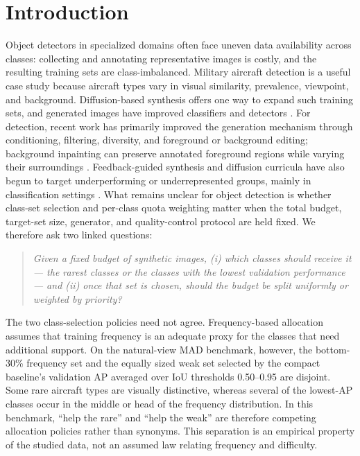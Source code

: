 \documentclass[preprint,12pt,authoryear]{elsarticle}
\begin{document}
\section{Introduction}\label{sec:intro}

Object detectors in specialized domains often face uneven data
availability across classes: collecting and annotating representative
images is costly, and the resulting training sets are class-imbalanced.
Military aircraft detection is a useful case study because aircraft
types vary in visual similarity, prevalence, viewpoint, and background.
Diffusion-based synthesis offers one way to expand such training sets,
and generated images have improved classifiers
\citep{azizi2023synthetic, he2023synthetic} and detectors
\citep{suri2024gen2det, feng2024instagen}. For detection, recent work has
primarily improved the generation mechanism through conditioning,
filtering, diversity, and foreground or background editing; background
inpainting can preserve annotated foreground regions while varying their
surroundings \citep{li2024background}. Feedback-guided synthesis and
diffusion curricula have also begun to target underperforming or
underrepresented groups, mainly in classification settings
\citep{hemmat2024feedback, liang2025discl}. What remains unclear for
object detection is whether class-set selection and per-class quota
weighting matter when the total budget, target-set size, generator, and
quality-control protocol are held fixed. We therefore ask two linked
questions:

\begin{quote}\itshape
Given a fixed budget of synthetic images, (i) which classes should
receive it --- the rarest classes or the classes with the lowest
validation performance --- and (ii) once that set is chosen, should the
budget be split uniformly or weighted by priority?
\end{quote}

The two class-selection policies need not agree. Frequency-based
allocation assumes that training frequency is an adequate proxy for the
classes that need additional support. On the natural-view MAD benchmark,
however, the bottom-30\% frequency set and the equally sized weak set
selected by the compact baseline's validation AP averaged over IoU
thresholds 0.50--0.95 are disjoint. Some
rare aircraft types are visually distinctive, whereas several of the
lowest-AP classes occur in the middle or head of the frequency
distribution. In this benchmark, ``help the rare'' and ``help the weak''
are therefore competing allocation policies rather than synonyms. This
separation is an empirical property of the studied data, not an assumed
law relating frequency and difficulty.
\end{document}
